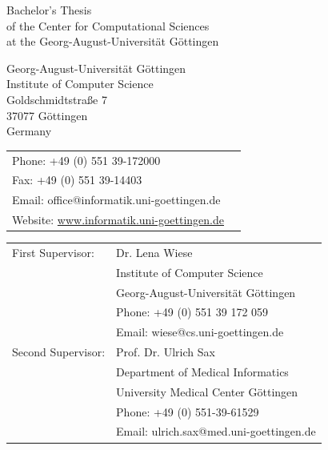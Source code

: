 \begin{titlepage}
    Bachelor's Thesis\\
    of the Center for Computational Sciences\\
    at the Georg-August-Universität Göttingen

    \vfill
    \mysubmissiondate


    \newpage
    \clearpage
    \thispagestyle{empty}
    \null
    \vspace{8cm}
    \flushleft
    \normalsize
    \onehalfspacing
    \normalfont
    

    Georg-August-Universität Göttingen\\
    Institute of Computer Science\\[3ex]
    Goldschmidtstraße 7\\
    37077 Göttingen\\
    Germany\\[3ex]

    \begin{tabular}{@{}ll}
        Phone: +49 (0) 551 39-172000\\
        Fax: +49 (0) 551 39-14403\\
        Email: office@informatik.uni-goettingen.de\\
        Website: \url{www.informatik.uni-goettingen.de}\\
    \end{tabular}

    \vspace{2.0cm}

    \begin{tabular}{@{}ll}
        First Supervisor: & Dr. Lena Wiese\\
        & Institute of Computer Science\\
        & Georg-August-Universität Göttingen\\
        & Phone: +49 (0) 551 39 172 059\\
        & Email: wiese@cs.uni-goettingen.de\\
        Second Supervisor:& Prof. Dr. Ulrich Sax\\
        & Department of Medical Informatics\\
        & University Medical Center Göttingen\\
        & Phone: +49 (0) 551-39-61529\\
        & Email: ulrich.sax@med.uni-goettingen.de\\
    \end{tabular}

    \clearpage
\end{titlepage}